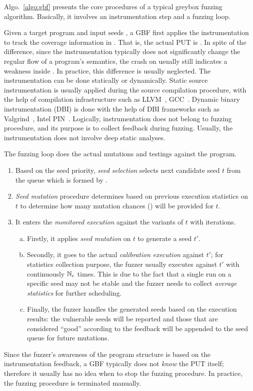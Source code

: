Algo.~\ref{algo:gbf} presents the core procedures of a typical greybox fuzzing algorithm. Basically, it involves an instrumentation step and a fuzzing loop.

Given a target program \ProgO and input seeds \Seeds, a GBF first applies the instrumentation to track the coverage information in \ProgO. That is, the actual PUT is \Prog. In spite of the difference, since the instrumentation typically does not significantly change the regular flow of a program's semantics, the crash on \Prog usually still indicates a weakness inside \ProgO. In practice, this difference is usually neglected.
The instrumentation can be done statically or dynamically. Static source instrumentation is usually applied during the source compilation procedure, with the help of compilation infrastructure such as LLVM~\cite{Lattner:2004:LCF:977395.977673}, GCC~\cite{gcc}. Dynamic binary instrumentation (DBI) is done with the help of DBI frameworks such as Valgrind~\cite{valgrind}, Intel PIN~\cite{pin}. Logically, instrumentation does not belong to fuzzing procedure, and its purpose is to collect feedback during fuzzing. Usually, the instrumentation does not involve deep static analyses.


The fuzzing loop does the actual mutations and testings against the program.
\begin{enumerate}[1.]
	\item Based on the seed priority, \emph{seed selection} selects next candidate seed $t$ from the queue which is formed by \Seeds.
	\item \emph{Seed mutation} procedure determines based on previous execution statistics on $t$ to determine how many mutation chances (\mutChance) will be provided for $t$.
	\item It enters the \emph{monitored execution} against the variants of $t$ with \mutChance iterations. 
	\begin{enumerate}[a)]
	\item Firstly, it applies \emph{seed mutation} on $t$ to generate a seed $t'$. 
	\item Secondly, it goes to the actual \emph{calibration execution} against $t'$; for statistics collection purpose, the fuzzer usually executes \Prog against $t'$ with continuously $\mathbb{N}_{c}$ times. This is due to the fact that a single run on a specific seed may not be stable and the fuzzer needs to collect \emph{average statistics} for further scheduling.
	\item Finally, the fuzzer handles the generated seeds based on the execution results: the vulnerable seeds will be reported and those that are considered ``good'' according to the feedback will be appended to the seed queue for future mutations.
	\end{enumerate}
\end{enumerate}
Since the fuzzer's awareness of the program structure is based on the instrumentation feedback, a GBF typically does not \emph{know} the PUT itself; therefore it usually has no idea when to stop the fuzzing procedure. In practice, the fuzzing procedure is terminated manually.

